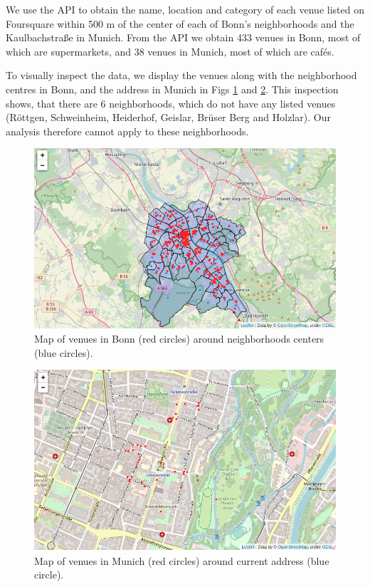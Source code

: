 \documentclass[UKenglish]{scrreprt}
\begin{document}
We use the API to obtain the name, location and category of each venue listed on Foursquare within 500 m of the center of each of Bonn's neighborhoods and the Kaulbachstraße in Munich. From the API we obtain 433 venues in Bonn, most of which are supermarkets, and 38 venues in Munich, most of which are cafés. 

To visually inspect the data, we display the venues along with the neighborhood centres in Bonn, and the address in Munich in Figs \ref{fig:map venues_bonn} and \ref{fig:map venues_munich}. This inspection shows, that there are 6 neighborhoods, which do not have any listed venues (Röttgen, Schweinheim, Heiderhof, Geislar, Brüser Berg and Holzlar). Our analysis therefore cannot apply to these neighborhoods.

\begin{figure}[htbp]
	\centering
	\includegraphics[width=\textwidth]{Figs/Map_Bonn_venues.png}
	\caption{Map of venues in Bonn (red circles) around neighborhoods centers (blue circles).}
	\label{fig:map venues_bonn}
\end{figure}

\begin{figure}[htbp]
	\centering
	\includegraphics[width=\textwidth]{Figs/Map_Munich_venues.png}
	\caption{Map of venues in Munich (red circles) around current address (blue circle).}
	\label{fig:map venues_munich}
\end{figure}
\end{document}
